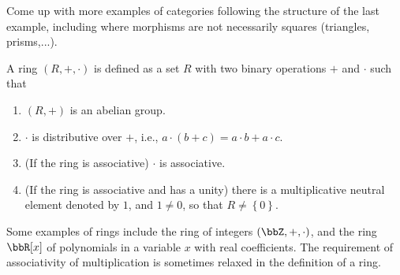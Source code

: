 \begin{xca}
    Come up with more examples of categories following the structure of
    the last example, including where morphisms are not necessarily squares
    (triangles, prisms,...).
\end{xca}
\begin{defn}[Rings]
    A ring $(R,+,\cdot)$ is defined as a set $R$ with two binary operations
    $+$ and $\cdot$ such that 
    \begin{enumerate}
        \item $(R,+)$ is an abelian group.
        \item $\cdot$ is distributive over $+$, i.e., $a\cdot(b+c)=a\cdot b+a\cdot c$.
        \item (If the ring is associative) $\cdot$ is associative.
        \item (If the ring is associative and has a unity) there is a multiplicative
        neutral element denoted by $1$, and $1\neq0$, so that $R\neq\left\{ 0\right\} $.
    \end{enumerate}
\end{defn}
Some examples of rings include the ring of integers $(\bbZ,+,\cdot)$,
and the ring $\bbR [x]$ of polynomials in a variable $x$ with
real coefficients. The requirement of associativity of multiplication
is sometimes relaxed in the definition of a ring.

